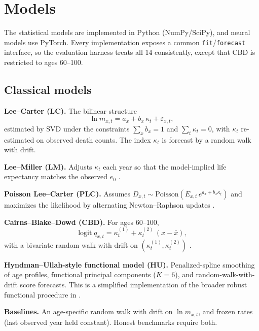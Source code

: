 \documentclass[11pt,a4paper]{article}
\begin{document}
\section{Models}
\label{sec:models}

The statistical models are implemented in Python (NumPy/SciPy), and neural models use PyTorch. Every implementation exposes a common \texttt{fit}/\texttt{forecast} interface, so the evaluation harness treats all 14 consistently, except that CBD is restricted to ages 60--100.

\subsection{Classical models}

\textbf{Lee--Carter (LC).} The bilinear structure
\begin{equation}
    \ln m_{x,t} = a_x + b_x\,\kappa_t + \varepsilon_{x,t},
\end{equation}
estimated by SVD under the constraints $\sum_x b_x = 1$ and $\sum_t \kappa_t = 0$, with $\kappa_t$ re-estimated on observed death counts. The index $\kappa_t$ is forecast by a random walk with drift.

\textbf{Lee--Miller (LM).} Adjusts $\kappa_t$ each year so that the model-implied life expectancy matches the observed $e_0$ \citep{lee2001evaluating}.

\textbf{Poisson Lee--Carter (PLC).} Assumes $D_{x,t} \sim \text{Poisson}\!\left(E_{x,t}\, e^{a_x + b_x \kappa_t}\right)$ and maximizes the likelihood by alternating Newton--Raphson updates \citep{brouhns2002poisson}.

\textbf{Cairns--Blake--Dowd (CBD).} For ages 60--100,
\begin{equation}
    \operatorname{logit} q_{x,t} = \kappa_t^{(1)} + \kappa_t^{(2)}\,(x - \bar{x}),
\end{equation}
with a bivariate random walk with drift on $(\kappa_t^{(1)}, \kappa_t^{(2)})$ \citep{cairns2006two}.

\textbf{Hyndman--Ullah-style functional model (HU).} Penalized-spline smoothing of age profiles, functional principal components ($K=6$), and random-walk-with-drift score forecasts. This is a simplified implementation of the broader robust functional procedure in \citet{hyndman2007robust}.

\textbf{Baselines.} An age-specific random walk with drift on $\ln m_{x,t}$, and frozen rates (last observed year held constant). Honest benchmarks require both.
\end{document}

